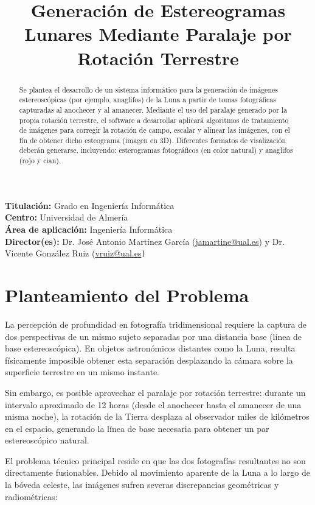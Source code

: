 \documentclass[11pt,a4paper]{article}
\title{Generación de Estereogramas Lunares Mediante Paralaje por Rotación Terrestre}
\begin{document}
\maketitle

\textbf{Titulación:} Grado en Ingeniería Informática\\
\textbf{Centro:} Universidad de Almería\\
\textbf{Área de aplicación:} Ingeniería Informática\\
\textbf{Director(es):} Dr. José Antonio Martínez García (\href{mailto:jamartine@ual.es}{jamartine@ual.es}) y Dr. Vicente González Ruiz (\href{mailto:vruiz@ual.es}{vruiz@ual.es}\texttt{)}

\begin{abstract}
	Se plantea el desarrollo de un sistema informático para la generación de imágenes estereoscópicas (por ejemplo, anaglifos) de la Luna a partir de tomas fotográficas capturadas al anochecer y al amanecer. Mediante el uso del paralaje generado por la propia rotación terrestre, el software a desarrollar aplicará algoritmos de tratamiento de imágenes para corregir la rotación de campo, escalar y alinear las imágenes, con el fin de obtener dicho esteograma (imagen en 3D). Diferentes formatos de visalización deberán generarse, incluyendo: esterogramas fotográficos (en color natural) y anaglifos (rojo y cian).
\end{abstract}

		
\section*{Planteamiento del Problema}
	
La percepción de profundidad en fotografía tridimensional requiere la captura de dos perspectivas de un mismo sujeto separadas por una distancia base (línea de base estereoscópica). En objetos astronómicos distantes como la Luna, resulta físicamente imposible obtener esta separación desplazando la cámara sobre la superficie terrestre en un mismo instante.
	
Sin embargo, es posible aprovechar el paralaje por rotación terrestre: durante un intervalo aproximado de 12 horas (desde el anochecer hasta el amanecer de una misma noche), la rotación de la Tierra desplaza al observador miles de kilómetros en el espacio, generando la línea de base necesaria para obtener un par estereoscópico natural.
	
El problema técnico principal reside en que las dos fotografías resultantes no son directamente fusionables. Debido al movimiento aparente de la Luna a lo largo de la bóveda celeste, las imágenes sufren severas discrepancias geométricas y radiométricas:
	
\end{document}
